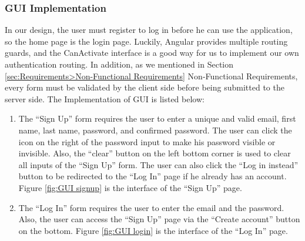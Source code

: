 \subsubsection{GUI Implementation}
In our design, the user must register to log in before he can use the application, so the home page is the login page. Luckily, Angular provides multiple routing guards, and the CanActivate interface is a good way for us to implement our own authentication routing. In addition, as we mentioned in Section \ref{sec:Requirements>Non-Functional Requirements} Non-Functional Requirements, every form must be validated by the client side before being submitted to the server side. The Implementation of GUI is listed below:

\begin{enumerate}
  \item The ``Sign Up'' form requires the user to enter a unique and valid email, first name, last name, password, and confirmed password. The user can click the icon on the right of the password input to make his password visible or invisible. Also, the ``clear'' button on the left bottom corner is used to clear all inputs of the ``Sign Up'' form. The user can also click the ``Log in instead'' button to be redirected to the ``Log In'' page if he already has an account. Figure \ref{fig:GUI signup} is the interface of the ``Sign Up'' page.

  \item The ``Log In'' form requires the user to enter the email and the password. Also, the user can access the ``Sign Up'' page via the ``Create account'' button on the bottom. Figure \ref{fig:GUI login} is the interface of the ``Log In'' page.


\end{enumerate}
